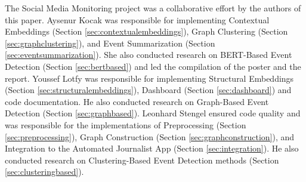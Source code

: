 The Social Media Monitoring project was a collaborative effort by the authors of this paper. Aysenur Kocak was responsible for implementing Contextual Embeddings (Section \ref{sec:contextualembeddings}), Graph Clustering (Section \ref{sec:graphclustering}), and Event Summarization (Section \ref{sec:eventsummarization}). She also conducted research on BERT-Based Event Detection (Section \ref{sec:bertbased}) and led the compilation of the poster and the report. Youssef Lotfy was responsible for implementing Structural Embeddings (Section \ref{sec:structuralembeddings}), Dashboard (Section \ref{sec:dashboard}) and code documentation. He also conducted research on Graph-Based Event Detection (Section \ref{sec:graphbased}). Leonhard Stengel ensured code quality and was responsible for the implementations of Preprocessing (Section \ref{sec:preprocessing}), Graph Construction (Section \ref{sec:graphconstruction}), and Integration to the Automated Journalist App (Section \ref{sec:integration}). He also conducted research on Clustering-Based Event Detection methods (Section \ref{sec:clusteringbased}).